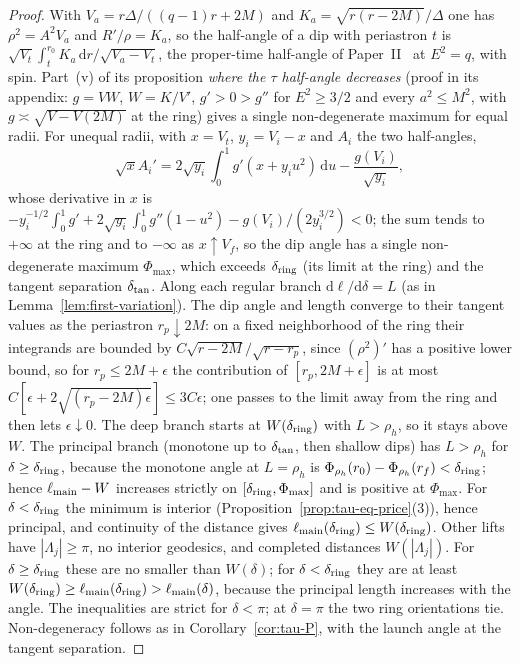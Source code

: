 \documentclass[aip,jmp,amsmath,amssymb,reprint]{revtex4-2}
\newcommand{\dd}{\mathrm{d}}
\theoremstyle{plain}
\theoremstyle{definition}
\begin{document}
\begin{proof}
With $V_a=r\Delta/((q-1)r+2M)$ and $K_a=\sqrt{r(r-2M)}/\Delta$ one has $\rho^2=A^2V_a$ and $R'/\rho=K_a$,
so the half-angle of a dip with periastron $t$ is
$\sqrt{V_t}\int_t^{r_0}K_a\,\dd r/\sqrt{V_a-V_t}$, the proper-time half-angle of
Paper~II~\cite{PaperTwo} at $E^2=q$, with spin. Part~(v) of its proposition \emph{where the $\tau$
half-angle decreases} (proof in its appendix: $g=VW$, $W=K/V'$, $g'>0>g''$ for $E^2\ge3/2$ and every $a^2\le M^2$,
with $g\asymp\sqrt{V-V(2M)}$ at the ring) gives a single non-degenerate maximum for equal radii. For
unequal radii, with $x=V_t$, $y_i=V_i-x$ and $A_i$ the two half-angles,
\[
  \sqrt x A_i'=2\sqrt{y_i}\int_0^1g'(x+y_iu^2)\,\dd u-\frac{g(V_i)}{\sqrt{y_i}},
\]
whose derivative in $x$ is
$-y_i^{-1/2}\int_0^1g'+2\sqrt{y_i}\int_0^1g''(1-u^2)-g(V_i)/(2y_i^{3/2})<0$; the sum tends to $+\infty$ at the ring
and to $-\infty$ as $x\uparrow V_f$, so the dip angle has a single non-degenerate maximum
$\Phi_{\max}$, which exceeds $\delta_{\rm ring}$ (its limit at the ring) and the tangent separation
$\delta_{\rm tan}$. Along each regular branch $\dd\ell/\dd\delta=L$ (as in Lemma~\ref{lem:first-variation}). The dip angle
and length converge to their tangent values as the periastron $r_p\downarrow2M$: on a fixed
neighborhood of the ring their integrands are bounded by $C\sqrt{r-2M}/\sqrt{r-r_p}$, since
$(\rho^2)'$ has a positive lower bound, so for $r_p\le2M+\epsilon$ the contribution of
$[r_p,2M+\epsilon]$ is at most $C[\epsilon+2\sqrt{(r_p-2M)\epsilon}]\le3C\epsilon$; one passes to the limit away
from the ring and then lets $\epsilon\downarrow0$. The deep branch starts at $W(\delta_{\rm ring})$ with $L>\rho_h$, so it stays above $W$. The principal branch
(monotone up to $\delta_{\rm tan}$, then shallow dips) has $L>\rho_h$ for $\delta\ge\delta_{\rm ring}$, because the monotone
angle at $L=\rho_h$ is $\Phi_{\rho_h}(r_0)-\Phi_{\rho_h}(r_f)<\delta_{\rm ring}$; hence $\ell_{\rm main}-W$ increases
strictly on $[\delta_{\rm ring},\Phi_{\max}]$ and is positive at $\Phi_{\max}$. For $\delta<\delta_{\rm ring}$ the minimum
is interior (Proposition~\ref{prop:tau-eq-price}(3)), hence principal, and continuity of the
distance gives $\ell_{\rm main}(\delta_{\rm ring})\le W(\delta_{\rm ring})$. Other lifts have $|\Lambda_j|\ge\pi$, no interior geodesics, and completed distances
$W(|\Lambda_j|)$. For $\delta\ge\delta_{\rm ring}$ these are no smaller than $W(\delta)$; for $\delta<\delta_{\rm ring}$ they are
at least $W(\delta_{\rm ring})\ge\ell_{\rm main}(\delta_{\rm ring})>\ell_{\rm main}(\delta)$, because the principal length
increases with the angle. The inequalities are strict for $\delta<\pi$; at $\delta=\pi$ the two ring
orientations tie. Non-degeneracy follows as in Corollary~\ref{cor:tau-P}, with the launch angle at the
tangent separation.
\end{proof}
\end{document}
